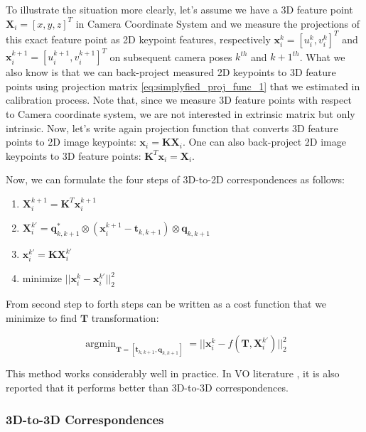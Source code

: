 \documentclass[a4paper]{report}
\numberwithin{figure}{section}
\newcommand{\argmin}{\mathop{\mathrm{argmin}}}
\begin{document}
To illustrate the 
situation more clearly, let's assume we have a 3D feature point 
$\mathbf{X}_i=[x, y, z]^T$ in Camera Coordinate System and we measure 
the projections of this exact feature point as 2D keypoint features, respectively 
$\mathbf{x}_i^k=[u_i^k,v_i^k]^T$ and $\mathbf{x}_i^{k+1}=[u_i^{k+1}, v_i^{k+1}]^T$ 
on subsequent camera poses $k^{th}$ and $k+1^{th}$. What we also know is that 
we can back-project measured 2D keypoints to 3D feature points using projection 
matrix \ref{eq:simplyfied_proj_func_1} that we estimated in calibration process. 
Note that, since we measure 3D feature points with respect to Camera coordinate system, 
we are not interested in extrinsic matrix but only intrinsic. Now, 
let's write again projection function that converts 3D feature 
points to 2D image keypoints:
$
\mathbf{x}_i = 
  \mathbf{K}\mathbf{X}_i
  $.
One can also back-project 2D image keypoints to 3D feature points:
$
  \mathbf{K}^T\mathbf{x}_{i} = 
  \mathbf{X}_{i} 
  $.

Now, we can formulate the four steps of 3D-to-2D correspondences as follows:

\begin{enumerate}
  \item $\mathbf{X}_{i}^{k+1} = \mathbf{K}^T\mathbf{x}_{i}^{k+1}$
  \item $\mathbf{X}_i^{k'} = 
    \mathbf{q}_{k,k+1}^* \otimes (\mathbf{x}_i^{k+1} - \mathbf{t}_{k,k+1}) \otimes \mathbf{q}_{k,k+1}$
  \item $\mathbf{x}_i^{k'} = \mathbf{K}\mathbf{X}_i^{k'}$
  \item minimize $||\mathbf{x}_i^k - \mathbf{x}_i^{k'}||_2^2$
\end{enumerate}

From second step to forth steps can be written as a cost function 
that we minimize to find $\mathbf{T}$ transformation:

\begin{equation}
  \argmin_{\mathbf{T} = [\mathbf{t}_{k,k+1}, \mathbf{q}_{k,k+1}]} = 
  ||\mathbf{x}_i^k - f(\mathbf{T}, \mathbf{X}_i^{k'})||^2_2
\end{equation}

This method works considerably well in practice. In VO literature \cite{}, 
it is also reported that it performs better than 3D-to-3D correspondences.

\subsubsection{3D-to-3D Correspondences}
\end{document}
